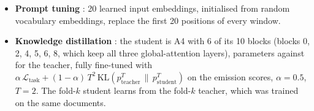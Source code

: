 \documentclass[11pt,a4paper]{article}
\begin{document}
\begin{itemize}
  prefix keys carry no rotary position, and every attention mask is extended to let all tokens attend to them.
  \item \textbf{Prompt tuning} \cite{lester2021prompt}: 20 learned input embeddings, initialised from random
  vocabulary embeddings, replace the first 20 positions of every window.
  \item \textbf{Knowledge distillation} \cite{hinton2015kd}: the student is A4 with 6 of its 10 blocks (blocks
  0, 2, 4, 5, 6, 8, which keep all three global-attention layers), \kdparams{} parameters against
  \teacherparams{} for the teacher, fully fine-tuned with
  $\alpha\,\mathcal{L}_\text{task} + (1-\alpha)\,T^2\,\mathrm{KL}(p^T_\text{teacher}\,\|\,p^T_\text{student})$
  on the emission scores, $\alpha=0.5$, $T=2$.  The fold-$k$ student learns from the fold-$k$ teacher, which
  was trained on the same documents.
\end{itemize}
\end{document}
